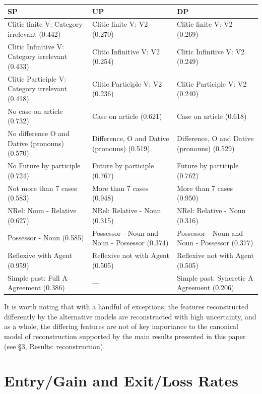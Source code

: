 \documentclass[12pt]{article}
\begin{document}
\begin{appendices}
\begin{center}
{\small
\begin{tabular}{p{.3\linewidth}p{.3\linewidth}p{.3\linewidth}}
\toprule
SP & UP & DP\\
\midrule
Clitic finite V: Category irrelevant (0.442) & Clitic finite V: V2 (0.270) & Clitic finite V: V2 (0.269)\\
\hline
Clitic Infinitive V: Category irrelevant (0.433) & Clitic Infinitive V: V2 (0.254) & Clitic Infinitive V: V2 (0.249)\\
\hline
Clitic Participle V: Category irrelevant (0.418) & Clitic Participle V: V2 (0.236) & Clitic Participle V: V2 (0.240)\\
\hline
No case on article (0.732) & Case on article (0.621) & Case on article (0.618)\\
\hline
No difference O and Dative (pronouns) (0.570) & Difference, O and Dative (pronouns) (0.519) & Difference, O and Dative (pronouns) (0.529)\\
\hline
No Future by participle (0.724) & Future by participle (0.767) & Future by participle (0.762)\\
\hline
Not more than 7 cases (0.583) & More than 7 cases (0.948) & More than 7 cases (0.950)\\
\hline
NRel: Noun - Relative (0.627) & NRel: Relative - Noun (0.315) & NRel: Relative - Noun (0.316)\\
\hline
Possessor - Noun (0.585) & Possessor - Noun and Noun - Possessor (0.374) & Possessor - Noun and Noun - Possessor (0.377)\\
\hline
Reflexive with Agent (0.959) & Reflexive not with Agent (0.505) & Reflexive not with Agent (0.505)\\
\hline
Simple past: Full A Agreement (0.386) & \centering --- & Simple past: Syncretic A Agreement (0.206)\\
\bottomrule
\end{tabular}
}
\end{center}

It is worth noting that with a handful of exceptions, the features reconstructed differently by the alternative models are reconstructed with high uncertainty, and as a whole, the differing features are not of key importance to the canonical model of reconstruction supported by the main results presented in this paper (see \S3, {\sc Results: reconstruction}).


\section{Entry/Gain and Exit/Loss Rates}


\end{appendices}
\end{document}
